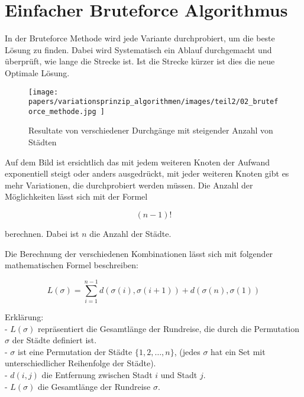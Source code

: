 %
%
%
%
\section{Einfacher Bruteforce Algorithmus}
In der Bruteforce Methode wird jede Variante durchprobiert, 
um die beste Lösung zu finden. Dabei wird Systematisch ein 
Ablauf durchgemacht und überprüft, wie lange die Strecke ist.
Ist die Strecke kürzer ist dies die neue Optimale Lösung.

\begin{figure} [h]
	\centering
	\texttt{[image: 
        papers/variationsprinzip\_algorithmen/images/teil2/02\_bruteforce\_methode.jpg
        ]}
	\caption{Resultate von verschiedener Durchgänge mit steigender Anzahl von Städten}
	\label{fig:results_bruteforce}
\end{figure}

Auf dem Bild ist ersichtlich das mit jedem weiteren Knoten der Aufwand 
exponentiell steigt oder anders ausgedrückt, mit jeder weiteren Knoten
gibt es mehr Variationen, die durchprobiert werden müssen. Die Anzahl 
der Möglichkeiten lässt sich mit der Formel

\begin{equation}
    (n-1)!
\end{equation}

berechnen. Dabei ist \(n\) die Anzahl der Städte.

Die Berechnung der verschiedenen Kombinationen lässt sich mit folgender 
mathematischen Formel beschreiben:

\begin{equation}
    \label{eq:bruteforce_min_formula}
    L(\sigma) = \sum_{i=1}^{n-1} d(\sigma(i), \sigma(i+1)) + d(\sigma(n), \sigma(1))
\end{equation}

Erklärung:\\
- \( L(\sigma) \)  repräsentiert die Gesamtlänge der Rundreise, die durch 
die Permutation \( \sigma \) der Städte definiert ist.\\
- \( \sigma \) ist eine Permutation der Städte \( \{1, 2, \ldots, n\} \),
 (jedes \( \sigma \) hat ein Set mit unterschiedlicher Reihenfolge der Städte).\\
- \( d(i, j) \) die Entfernung zwischen Stadt \( i \) und Stadt \( j \).\\
- \( L(\sigma) \) die Gesamtlänge der Rundreise \( \sigma \).\\

